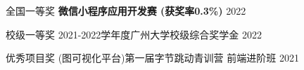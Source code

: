 

\begin{cvhonors}

    \cvhonor
    {全国一等奖} %
    {\textbf{微信小程序应用开发赛 (获奖率0.3\%)}} %
    {} %
    {2022} %

    \cvhonor
    {校级一等奖} %
    {2021-2022学年度广州大学校级综合奖学金} %
    {} %
    {2022} %

    \cvhonor
    {优秀项目奖} %
    {(图可视化平台)第一届字节跳动青训营 前端进阶班} %
    {} %
    {2021} %


\end{cvhonors}
